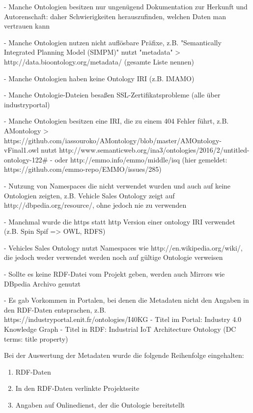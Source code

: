 \documentclass{article}
\begin{document}
- Manche Ontologien besitzen nur ungenügend Dokumentation zur Herkunft und Autorenschaft: daher Schwierigkeiten herauszufinden, welchen Daten man vertrauen kann

- Manche Ontologien nutzen nicht auflösbare Präfixe, z.B. "Semantically Integrated Planning Model (SIMPM)" nutzt "metadata" > http://data.bioontology.org/metadata/ (gesamte Liste nennen)

- Manche Ontologien haben keine Ontology IRI (z.B. IMAMO)

- Manche Ontologie-Dateien besaßen SSL-Zertifikatsprobleme (alle über industryportal)

- Manche Ontologien besitzen eine IRI, die zu einem 404 Fehler führt, z.B. AMontology > https://github.com/iassouroko/AMontology/blob/master/AMOntology-vFinal1.owl nutzt http://www.semanticweb.org/ina3/ontologies/2016/2/untitled-ontology-122\#
  - oder http://emmo.info/emmo/middle/isq (hier gemeldet: https://github.com/emmo-repo/EMMO/issues/285)

- Nutzung von Namespaces die nicht verwendet wurden und auch auf keine Ontologien zeigten, z.B. Vehicle Sales Ontology zeigt auf http://dbpedia.org/resource/, ohne jedoch nie zu verwenden

- Manchmal wurde die https statt http Version einer ontology IRI verwendet (z.B. Spin Spif => OWL, RDFS)

- Vehicles Sales Ontology nutzt Namespaces wie http://en.wikipedia.org/wiki/, die jedoch weder verwendet werden noch auf gültige Ontologie verweisen

- Sollte es keine RDF-Datei vom Projekt geben, werden auch Mirrors wie DBpedia Archivo genutzt

- Es gab Vorkommen in Portalen, bei denen die Metadaten nicht den Angaben in den RDF-Daten entsprachen, z.B. https://industryportal.enit.fr/ontologies/I40KG
  - Titel im Portal: Industry 4.0 Knowledge Graph
  - Titel in RDF: Industrial IoT Architecture Ontology (DC terms: title property)

Bei der Auswertung der Metadaten wurde die folgende Reihenfolge eingehalten:

\begin{enumerate}
    \item RDF-Daten
    \item In den RDF-Daten verlinkte Projektseite
    \item Angaben auf Onlinedienst, der die Ontologie bereitstellt
\end{enumerate}
\end{document}

